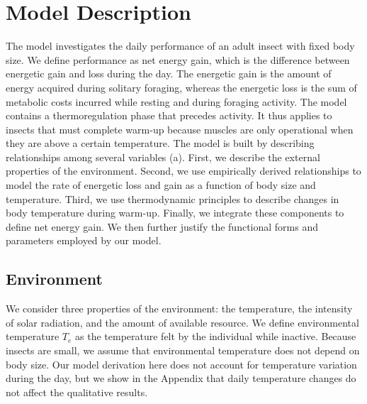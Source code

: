 \section*{Model Description}



The model investigates the daily performance of an adult insect with fixed body size.
We define performance as net energy gain, which is the difference between energetic gain and loss during the day.
The energetic gain is the amount of energy acquired during solitary foraging, whereas the energetic loss is the sum of metabolic costs incurred while resting and during foraging activity.
The model contains a thermoregulation phase that precedes activity.
It thus applies to insects that must complete warm-up because muscles are only operational when they are above a certain temperature.
The model is built by describing relationships among several variables (a).
First, we describe the external properties of the environment.
Second, we use empirically derived relationships to model the rate of energetic loss and gain as a function of body size and temperature.
Third, we use thermodynamic principles to describe changes in body temperature during warm-up.
Finally, we integrate these components to define net energy gain.
We then further justify the functional forms and parameters employed by our model.

\subsection*{Environment}

We consider three properties of the environment: the temperature, the intensity of solar radiation, and the amount of available resource.
We define environmental temperature $T_e$ as the temperature felt by the individual while inactive.
Because insects are small, we assume that environmental temperature does not depend on body size.
Our model derivation here does not account for temperature variation during the day, but we show in the Appendix that daily temperature changes do not affect the qualitative results.

